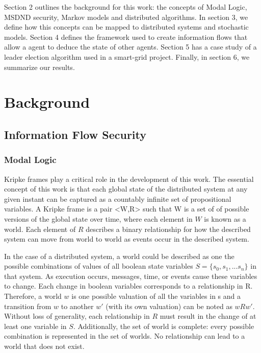 Section 2 outlines the background for this work: the concepts of Modal Logic, MSDND security, Markov models and distributed algorithms. In section 3, we define how this concepts can be mapped to distributed systems and stochastic models. Section 4 defines the framework used to create information flows that allow a agent to deduce the state of other agents. Section 5 has a case study of a leader election algorithm used in a smart-grid project. Finally, in section 6, we summarize our results.

\section{Background}

\subsection{Information Flow Security}

\subsubsection{Modal Logic}

Kripke frames play a critical role in the development of this work. The essential concept of this work is that each global state of the distributed system at any given instant can be captured as a countably infinite set of propositional variables. A Kripke frame is a pair <W,R> such that W is a set of of possible versions of the global state over time, where each element in $W$ is known as a world. Each element of $R$ describes a binary relationship for how the described system can move from world to world as events occur in the described system.

In the case of a distributed system, a world could be described as one the possible combinations of values of all boolean state variables $S=\{s_0, s_1, ... s_n\}$ in that system. As execution occurs, messages, time, or events cause these variables to change. Each change in boolean variables corresponds to a relationship in R. Therefore, a world $w$ is one possible valuation of all the variables in s and a transition from $w$ to another $w'$ (with its own valuation) can be noted as $wRw'$. Without loss of generality, each relationship in $R$ must result in the change of at least one variable in $S$. Additionally, the set of world is complete: every possible combination is represented in the set of worlds. No relationship can lead to a world that does not exist.

